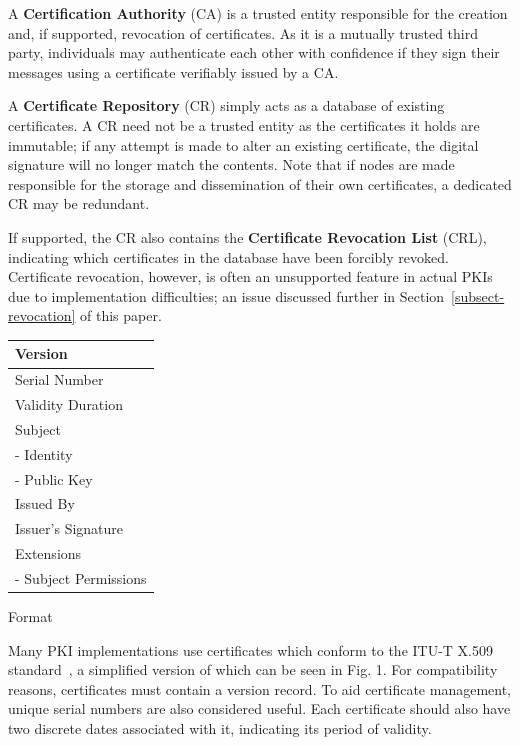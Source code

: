 \documentclass[times, 10pt,twocolumn]{article}
\begin{document}
A \textbf{Certification Authority} (CA) is a trusted entity responsible
for the creation and, if supported, revocation of certificates. As it
is a mutually trusted third party, individuals may authenticate each
other with confidence if they sign their messages using a certificate
verifiably issued by a CA.

A \textbf{Certificate Repository} (CR) simply acts as a database of
existing certificates. A CR need not be a trusted entity as the
certificates it holds are immutable; if any attempt is made to alter an
existing certificate, the digital signature will no longer match the
contents. Note that if nodes are made responsible for the storage and
dissemination of their own certificates, a dedicated CR may be
redundant.

If supported, the CR also contains the \textbf{Certificate Revocation
List} (CRL), indicating which certificates in the database have been
forcibly revoked. Certificate revocation, however, is often an
unsupported feature in actual PKIs due to implementation difficulties;
an issue discussed further in Section~\ref{subsect-revocation} of this
paper.

\begin{floatingtable}[r]{
\label{fig-certificate}
\begin{tabular}{|l|}
\hline
Version\\\hline
Serial Number\\\hline
Validity Duration\\\hline
Subject\\
- Identity\\
- Public Key\\\hline
Issued By\\\hline
Issuer's Signature\\\hline
Extensions\\
- Subject Permissions\\\hline
\end{tabular}
}
\caption{Format}
\end{floatingtable}

Many PKI implementations use certificates which conform to the ITU-T
X.509 standard~\cite{X509}, a simplified version of which can be seen
in Fig. 1. For compatibility reasons, certificates must contain a
version record. To aid certificate management, unique serial numbers
are also considered useful. Each certificate should also have two
discrete dates associated with it, indicating its period of validity.
\end{document}
